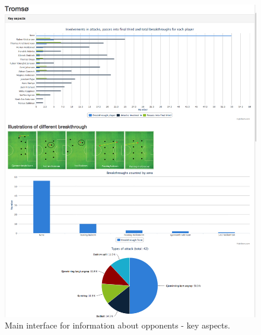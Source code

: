 \begin{figure}[H]
\centering
\includegraphics[width=1\textwidth]{images/general/team_analysis1.png}
\caption{Main interface for information about opponents - key aspects.}
\label{fig:team_analysis1}
\end{figure}

